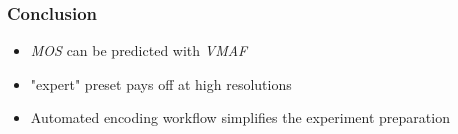\begin{frame}
	\frametitle{Conclusion}
	\begin{itemize}
		\item \textit{MOS} can be predicted with \textit{VMAF}
		\item "expert" preset pays off at high resolutions
		\item Automated encoding workflow simplifies the experiment preparation
	\end{itemize}
\end{frame}